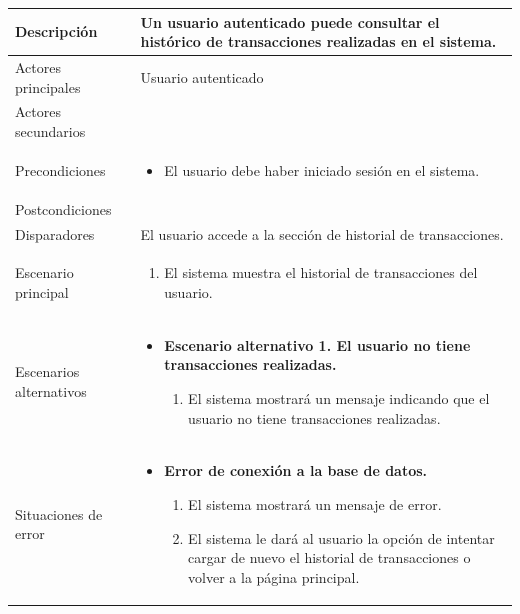\begin{longtable}{
    >{\columncolor{lightgreen!20}}p{4cm}
    >{\columncolor{white}}p{12cm} 
    }
    \midrule
    Descripción & Un usuario autenticado puede consultar el histórico de transacciones realizadas en el sistema. \\
    \midrule
    Actores principales & Usuario autenticado \\
    \midrule
    Actores secundarios &  \\
    \midrule
    Precondiciones & \begin{itemize}[nosep,leftmargin=*]
        \item El usuario debe haber iniciado sesión en el sistema.
    \end{itemize} \\
    \midrule
    Postcondiciones & \\
    \midrule
    Disparadores & El usuario accede a la sección de historial de transacciones. \\
    \midrule
    Escenario principal & \begin{enumerate}[nosep,leftmargin=*]
        \item El sistema muestra el historial de transacciones del usuario.
    \end{enumerate} \\
    \midrule
    Escenarios alternativos & 
    \begin{itemize}[nosep,leftmargin=*]
        \item \textbf{Escenario alternativo 1. El usuario no tiene transacciones realizadas.}
        \begin{enumerate}[nosep,leftmargin=*]
            \item El sistema mostrará un mensaje indicando que el usuario no tiene transacciones realizadas.
        \end{enumerate}
    \end{itemize} \\
    \midrule
    Situaciones de error & 
    \begin{itemize}[nosep,leftmargin=*]
        \item \textbf{Error de conexión a la base de datos.}
        \begin{enumerate}[nosep,leftmargin=*]
            \item El sistema mostrará un mensaje de error.
            \item El sistema le dará al usuario la opción de intentar cargar de nuevo el historial de transacciones o volver a la página principal.
        \end{enumerate}
    \end{itemize} \\
\end{longtable}